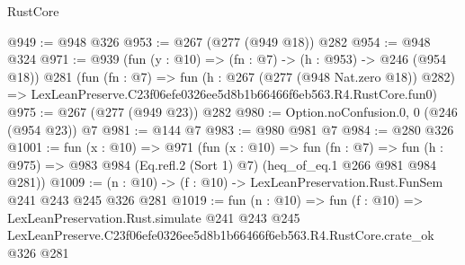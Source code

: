 \begin{lexlean}{RustCore}
\begin{coremodule}
@949 := @948 @326
@953 := @267 (@277 (@949 @18)) @282
@954 := @948 @324
@971 := @939
    (fun (y : @10) => (fn : @7) -> (h : @953) -> @246 (@954 @18))
    @281
    (fun (fn : @7) =>
    fun (h : @267 (@277 (@948 Nat.zero @18)) @282) =>
    LexLeanPreserve.C23f06efe0326ee5d8b1b66466f6eb563.R4.RustCore.fun0)
@975 := @267 (@277 (@949 @23)) @282
@980 := Option.noConfusion.{0, 0} (@246 (@954 @23)) @7
@981 := @144 @7
@983 := @980 @981 @7
@984 := @280 @326
@1001 := fun (x : @10) =>
  @971
    (fun (x : @10) =>
    fun (fn : @7) =>
    fun (h : @975) => @983 @984 (Eq.refl.{2} (Sort 1) @7) (heq_of_eq.{1} @266 @981 @984 @281))
@1009 := (n : @10) -> (f : @10) -> LexLeanPreservation.Rust.FunSem @241 @243 @245 @326 @281
@1019 := fun (n : @10) =>
  fun (f : @10) =>
  LexLeanPreservation.Rust.simulate
    @241
    @243
    @245
    LexLeanPreserve.C23f06efe0326ee5d8b1b66466f6eb563.R4.RustCore.crate_ok
    @326
    @281
\end{coremodule}
\end{lexlean}
